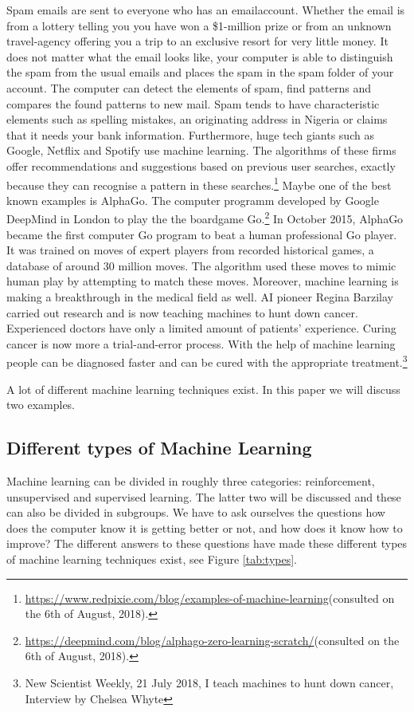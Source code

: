 \documentclass[11pt]{article}
\begin{document}
Spam emails are sent to everyone who has an emailaccount. Whether the email is from a lottery telling you you have won a \$1-million prize or from an unknown travel-agency offering you a trip to an exclusive resort for very little money. It does not matter what the email looks like, your computer is able to distinguish the spam from the usual emails and places the spam in the spam folder of your account. The computer can detect the elements of spam, find patterns and compares the found patterns to new mail. Spam tends to have characteristic elements such as spelling mistakes, an originating address in Nigeria or claims that it needs your bank information. Furthermore, huge tech giants such as Google, Netflix and Spotify use machine learning. The algorithms of these firms offer recommendations and suggestions based on previous user searches, exactly because they can recognise a pattern in these searches.\footnote{\url{https://www.redpixie.com/blog/examples-of-machine-learning}(consulted on the 6th of August, 2018).} Maybe one of the best known examples is AlphaGo. The computer programm developed by Google DeepMind in London to play the the boardgame Go.\footnote{\url{https://deepmind.com/blog/alphago-zero-learning-scratch/}(consulted on the 6th of August, 2018).} In October 2015, AlphaGo became the first computer Go program to beat a human professional Go player. It was trained on moves of expert players from recorded historical games, a database of around 30 million moves. The algorithm used these moves to mimic human play by attempting to match these moves. Moreover, machine learning is making a breakthrough in the medical field as well. AI pioneer Regina Barzilay carried out research and is now teaching machines to hunt down cancer. Experienced doctors have only a limited amount of patients' experience. Curing cancer is now more a trial-and-error process. With the help of machine learning people can be diagnosed faster and can be cured with the appropriate treatment.\footnote{New Scientist Weekly, 21 July 2018, I teach machines to hunt down cancer, Interview by Chelsea Whyte}   

A lot of different machine learning techniques exist. In this paper we will discuss two examples.


\subsection{Different types of Machine Learning}
\label{sec:org1a6e53f}
Machine learning can be divided in roughly three categories: reinforcement, unsupervised and supervised learning. The latter two will be discussed and these can also be divided in subgroups. We have to ask ourselves the questions how does the computer know it is getting better or not, and how does it know how to improve? The different answers to these questions have made these different types of machine learning techniques exist, see Figure \ref{tab:types}. 
\end{document}
